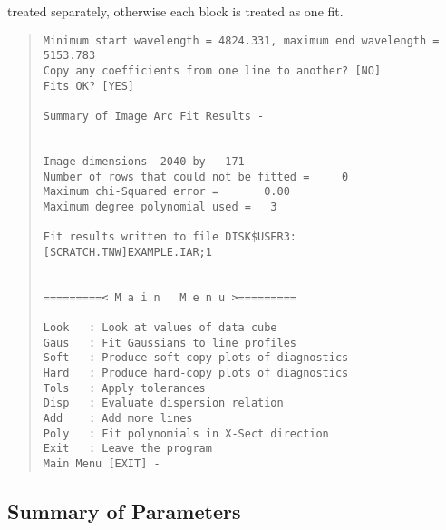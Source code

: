 treated separately, otherwise each block is treated as one fit.
\begin{quote}\begin{verbatim}
Minimum start wavelength = 4824.331, maximum end wavelength = 5153.783
Copy any coefficients from one line to another? [NO]
Fits OK? [YES]
 
Summary of Image Arc Fit Results -
-----------------------------------
 
Image dimensions  2040 by   171
Number of rows that could not be fitted =     0
Maximum chi-Squared error =       0.00
Maximum degree polynomial used =   3
 
Fit results written to file DISK$USER3:[SCRATCH.TNW]EXAMPLE.IAR;1
 
 
=========< M a i n   M e n u >=========
 
Look   : Look at values of data cube
Gaus   : Fit Gaussians to line profiles
Soft   : Produce soft-copy plots of diagnostics
Hard   : Produce hard-copy plots of diagnostics
Tols   : Apply tolerances
Disp   : Evaluate dispersion relation
Add    : Add more lines
Poly   : Fit polynomials in X-Sect direction
Exit   : Leave the program
Main Menu [EXIT] -
\end{verbatim}\end{quote}

\subsection{Summary of Parameters}

